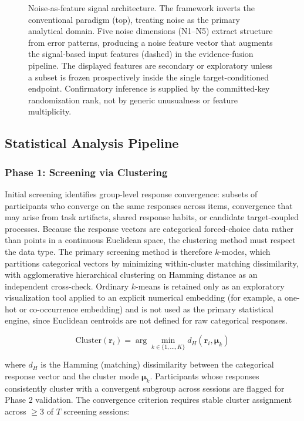 \documentclass[11pt,letterpaper]{article}
\begin{document}
\begin{figure}[t]
\begin{tikzpicture}[scale=0.62, every node/.style={transform shape}]
\end{tikzpicture}
\caption{Noise-as-feature signal architecture. The framework inverts the conventional paradigm (top), treating noise as the primary analytical domain. Five noise dimensions (N1--N5) extract structure from error patterns, producing a noise feature vector that augments the signal-based input features (dashed) in the evidence-fusion pipeline. The displayed features are secondary or exploratory unless a subset is frozen prospectively inside the single target-conditioned endpoint. Confirmatory inference is supplied by the committed-key randomization rank, not by generic unusualness or feature multiplicity.}
\label{fig:naf}
\end{figure}


\subsection{Statistical Analysis Pipeline}

\subsubsection{Phase 1: Screening via Clustering}

Initial screening identifies group-level response convergence: subsets of participants who converge on the same responses across items, convergence that may arise from task artifacts, shared response habits, or candidate target-coupled processes. Because the response vectors are categorical forced-choice data rather than points in a continuous Euclidean space, the clustering method must respect the data type. The primary screening method is therefore $k$-modes, which partitions categorical vectors by minimizing within-cluster matching dissimilarity, with agglomerative hierarchical clustering on Hamming distance as an independent cross-check. Ordinary $k$-means is retained only as an exploratory visualization tool applied to an explicit numerical embedding (for example, a one-hot or co-occurrence embedding) and is not used as the primary statistical engine, since Euclidean centroids are not defined for raw categorical responses.

\begin{equation}
\text{Cluster}(\mathbf{r}_i) = \arg\min_{k \in \{1,\ldots,K\}} d_H(\mathbf{r}_i, \boldsymbol{\mu}_k)
\label{eq:kmodes}
\end{equation}

where $d_H$ is the Hamming (matching) dissimilarity between the categorical response vector and the cluster mode $\boldsymbol{\mu}_k$. Participants whose responses consistently cluster with a convergent subgroup across sessions are flagged for Phase 2 validation. The convergence criterion requires stable cluster assignment across $\geq$3 of $T$ screening sessions:
\end{document}
